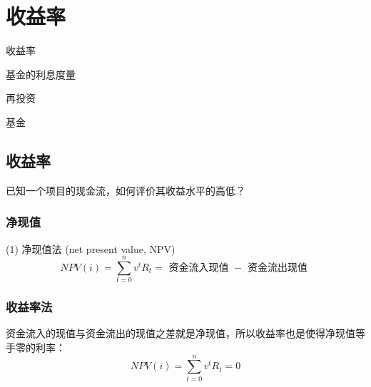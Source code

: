 \chapter{收益率}
\begin{introduction}
	\item 收益率
	\item 基金的利息度量
	\item 再投资
	\item 基金
\end{introduction}
\section{收益率}
已知一个项目的现金流，如何评价其收益水平的高低？\\
\subsection{净现值}
(1) 净现值法 (net present value, NPV)
\[
N P V(i)=\sum_{t=0}^{n} v^{t} R_{t}=\text { 资金流入现值 }-\text { 资金流出现值 }
\]
\subsection{收益率法}
资金流入的现值与资金流出的现值之差就是净现值，所以收益率也是使得净现值等手零的利率：
\[
N P V(i)=\sum_{t=0}^{n} v^{t} R_{t}=0
\]
